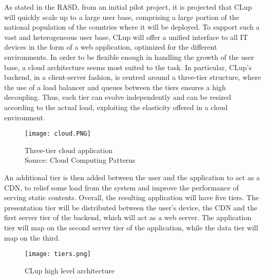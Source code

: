 \documentclass[../../main.tex]{subfiles}
\begin{document}
As stated in the RASD, from an initial pilot project, it is projected that CLup will quickly scale up to a large user base, 
comprising a large portion of the national population of the countries where it will be deployed. 
To support such a vast and heterogeneous user base, 
CLup will offer a unified interface to all IT devices in the form of a web application, optimized for the different environments.
In order to be flexible enough in handling the growth of the user base, a cloud architecture seems most suited to the task. 
In particular, CLup's backend, in a client-server fashion, is centred around a three-tier structure, where the use of a load balancer 
and queues between the tiers ensures a high decoupling. 
Thus, each tier can evolve independently and can be resized according to the actual load, 
exploiting the elasticity offered in a cloud environment.

\begin{figure}[H]
    \centering
    \texttt{[image: cloud.PNG]}
    \caption{
        Three-tier cloud application\\
        Source: Cloud Computing Patterns
    }
\end{figure}

An additional tier is then added between the user and the application to act as a CDN, to relief some load from the system and improve the performance of serving static contents. Overall,
 the resulting application will have five tiers.
The presentation tier will be distributed between the user's device, the CDN and the first server tier of the backend, which will act as a web server. The application tier will map on the second server tier of the application, while the data tier will map on the third.


\begin{figure}[H]
    \centering
    \texttt{[image: tiers.png]}
    \caption{
        CLup high level architecture
    }
\end{figure}
\end{document}
